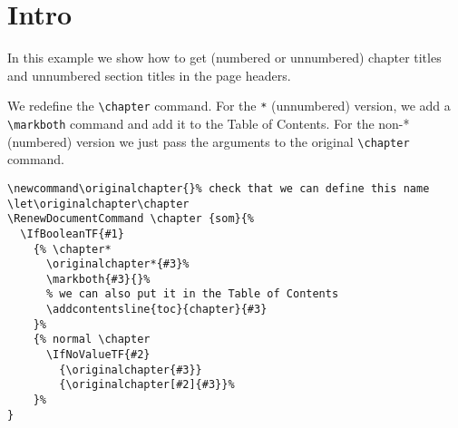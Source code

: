 \documentclass{report}
\newcommand\originalchapter{}%
\let\originalchapter\chapter
\begin{document}
\tableofcontents

\chapter*{Intro}

\noindent
\begin{boxedminipage}{\textwidth}
In this example we show how to get (numbered or unnumbered) chapter titles and unnumbered section titles in the page headers.

We redefine the \verb|\chapter| command. For the \texttt{*} (unnumbered)
version, we add a \verb|\markboth| command and add it to the Table of
Contents. For the non-* (numbered) version we just pass the arguments to
the original \verb|\chapter| command.

{\small\begin{verbatim}
\newcommand\originalchapter{}% check that we can define this name
\let\originalchapter\chapter
\RenewDocumentCommand \chapter {som}{%
  \IfBooleanTF{#1}
    {% \chapter*
      \originalchapter*{#3}%
      \markboth{#3}{}%
      % we can also put it in the Table of Contents
      \addcontentsline{toc}{chapter}{#3}
    }%
    {% normal \chapter
      \IfNoValueTF{#2}
        {\originalchapter{#3}}
        {\originalchapter[#2]{#3}}%
    }%
}
\end{verbatim}}
\end{boxedminipage}
\end{document}
